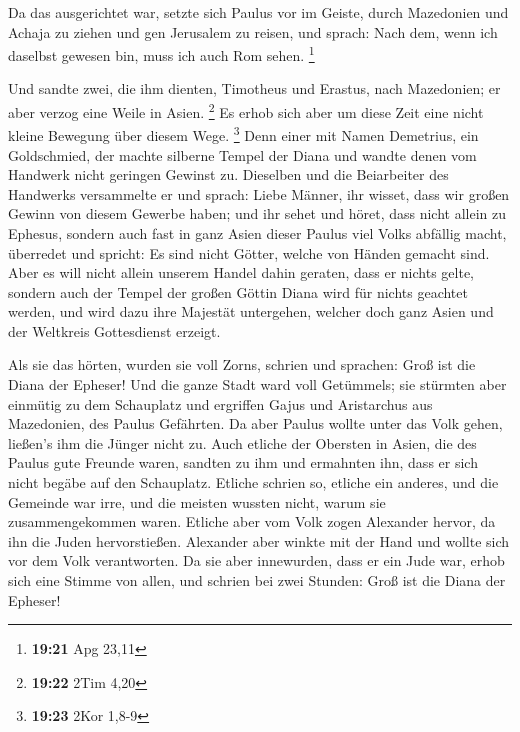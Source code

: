  Da das ausgerichtet war, setzte sich Paulus vor im
Geiste, durch Mazedonien und Achaja zu ziehen und gen Jerusalem zu
reisen, und sprach: Nach dem, wenn ich daselbst gewesen bin, muss ich
auch Rom sehen. \footnote{\textbf{19:21} Apg 23,11}

 Und sandte zwei, die ihm dienten, Timotheus und Erastus,
nach Mazedonien; er aber verzog eine Weile in Asien. \footnote{\textbf{19:22}
  2Tim 4,20}  Es erhob sich aber um diese Zeit eine nicht
kleine Bewegung über diesem Wege. \footnote{\textbf{19:23} 2Kor 1,8-9}
 Denn einer mit Namen Demetrius, ein Goldschmied, der
machte silberne Tempel der Diana und wandte denen vom Handwerk nicht
geringen Gewinst zu.  Dieselben und die Beiarbeiter des
Handwerks versammelte er und sprach: Liebe Männer, ihr wisset, dass wir
großen Gewinn von diesem Gewerbe haben;  und ihr sehet
und höret, dass nicht allein zu Ephesus, sondern auch fast in ganz Asien
dieser Paulus viel Volks abfällig macht, überredet und spricht: Es sind
nicht Götter, welche von Händen gemacht sind.  Aber es
will nicht allein unserem Handel dahin geraten, dass er nichts gelte,
sondern auch der Tempel der großen Göttin Diana wird für nichts geachtet
werden, und wird dazu ihre Majestät untergehen, welcher doch ganz Asien
und der Weltkreis Gottesdienst erzeigt.

 Als sie das hörten, wurden sie voll Zorns, schrien und
sprachen: Groß ist die Diana der Epheser!  Und die ganze
Stadt ward voll Getümmels; sie stürmten aber einmütig zu dem Schauplatz
und ergriffen Gajus und Aristarchus aus Mazedonien, des Paulus
Gefährten.  Da aber Paulus wollte unter das Volk gehen,
ließen's ihm die Jünger nicht zu.  Auch etliche der
Obersten in Asien, die des Paulus gute Freunde waren, sandten zu ihm und
ermahnten ihn, dass er sich nicht begäbe auf den Schauplatz.
 Etliche schrien so, etliche ein anderes, und die
Gemeinde war irre, und die meisten wussten nicht, warum sie
zusammengekommen waren.  Etliche aber vom Volk zogen
Alexander hervor, da ihn die Juden hervorstießen. Alexander aber winkte
mit der Hand und wollte sich vor dem Volk verantworten. 
Da sie aber innewurden, dass er ein Jude war, erhob sich eine Stimme von
allen, und schrien bei zwei Stunden: Groß ist die Diana der Epheser!

